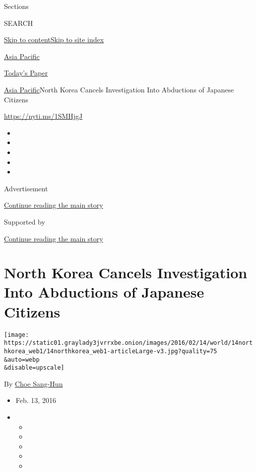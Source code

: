 Sections

SEARCH

\protect\hyperlink{site-content}{Skip to
content}\protect\hyperlink{site-index}{Skip to site index}

\href{https://www.nytimes3xbfgragh.onion/section/world/asia}{Asia
Pacific}

\href{https://myaccount.nytimes3xbfgragh.onion/auth/login?response_type=cookie\&client_id=vi}{}

\href{https://www.nytimes3xbfgragh.onion/section/todayspaper}{Today's
Paper}

\href{/section/world/asia}{Asia Pacific}\textbar{}North Korea Cancels
Investigation Into Abductions of Japanese Citizens

\url{https://nyti.ms/1SMHjgJ}

\begin{itemize}
\item
\item
\item
\item
\item
\end{itemize}

Advertisement

\protect\hyperlink{after-top}{Continue reading the main story}

Supported by

\protect\hyperlink{after-sponsor}{Continue reading the main story}

\hypertarget{north-korea-cancels-investigation-into-abductions-of-japanese-citizens}{%
\section{North Korea Cancels Investigation Into Abductions of Japanese
Citizens}\label{north-korea-cancels-investigation-into-abductions-of-japanese-citizens}}

\texttt{[image: https://static01.graylady3jvrrxbe.onion/images/2016/02/14/world/14northkorea\_web1/14northkorea\_web1-articleLarge-v3.jpg?quality=75\\\&auto=webp\\\&disable=upscale]}

By \href{http://www.nytimes3xbfgragh.onion/by/choe-sang-hun}{Choe
Sang-Hun}

\begin{itemize}
\item
  Feb. 13, 2016
\item
  \begin{itemize}
  \item
  \item
  \item
  \item
  \item
  \end{itemize}
\end{itemize}

